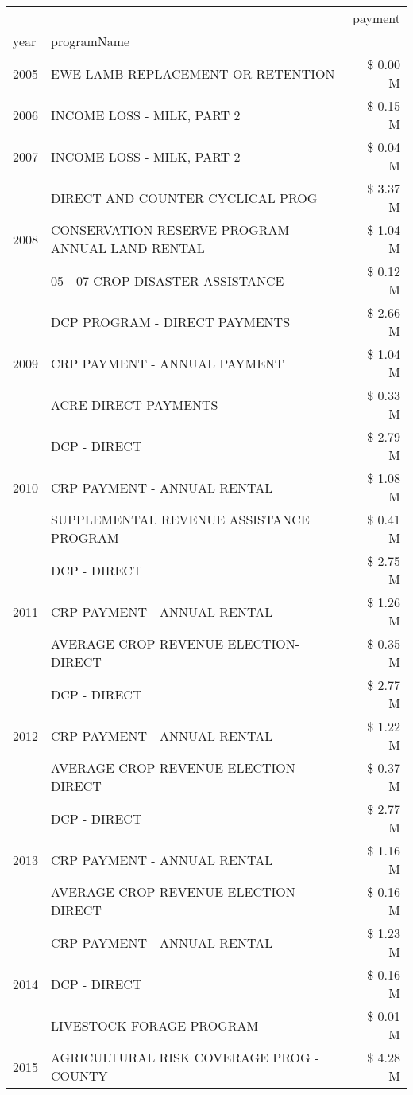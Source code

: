 \begin{tabular}{llr}
\toprule
 &  & payment \\
year & programName &  \\
\midrule
2005 & EWE LAMB REPLACEMENT OR RETENTION & \$ 0.00 M \\
\cline{1-3}
2006 & INCOME LOSS - MILK, PART 2 & \$ 0.15 M \\
\cline{1-3}
2007 & INCOME LOSS - MILK, PART 2 & \$ 0.04 M \\
\cline{1-3}
\multirow[t]{3}{*}{2008} & DIRECT AND COUNTER CYCLICAL PROG & \$ 3.37 M \\
 & CONSERVATION RESERVE PROGRAM - ANNUAL LAND RENTAL & \$ 1.04 M \\
 & 05 - 07 CROP DISASTER ASSISTANCE & \$ 0.12 M \\
\cline{1-3}
\multirow[t]{3}{*}{2009} & DCP PROGRAM - DIRECT PAYMENTS & \$ 2.66 M \\
 & CRP PAYMENT - ANNUAL PAYMENT & \$ 1.04 M \\
 & ACRE DIRECT PAYMENTS & \$ 0.33 M \\
\cline{1-3}
\multirow[t]{3}{*}{2010} & DCP - DIRECT & \$ 2.79 M \\
 & CRP PAYMENT - ANNUAL RENTAL & \$ 1.08 M \\
 & SUPPLEMENTAL REVENUE ASSISTANCE PROGRAM & \$ 0.41 M \\
\cline{1-3}
\multirow[t]{3}{*}{2011} & DCP - DIRECT & \$ 2.75 M \\
 & CRP PAYMENT - ANNUAL RENTAL & \$ 1.26 M \\
 & AVERAGE CROP REVENUE ELECTION-DIRECT & \$ 0.35 M \\
\cline{1-3}
\multirow[t]{3}{*}{2012} & DCP - DIRECT & \$ 2.77 M \\
 & CRP PAYMENT - ANNUAL RENTAL & \$ 1.22 M \\
 & AVERAGE CROP REVENUE ELECTION-DIRECT & \$ 0.37 M \\
\cline{1-3}
\multirow[t]{3}{*}{2013} & DCP - DIRECT & \$ 2.77 M \\
 & CRP PAYMENT - ANNUAL RENTAL & \$ 1.16 M \\
 & AVERAGE CROP REVENUE ELECTION-DIRECT & \$ 0.16 M \\
\cline{1-3}
\multirow[t]{3}{*}{2014} & CRP PAYMENT - ANNUAL RENTAL & \$ 1.23 M \\
 & DCP - DIRECT & \$ 0.16 M \\
 & LIVESTOCK FORAGE PROGRAM & \$ 0.01 M \\
\cline{1-3}
\multirow[t]{3}{*}{2015} & AGRICULTURAL RISK COVERAGE PROG - COUNTY & \$ 4.28 M \\

\end{tabular}
